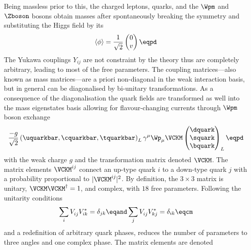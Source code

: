Being massless prior to this, the charged leptons, quarks, and the $\Wpm$ and
$\Zboson$ bosons obtain masses after spontaneously breaking the symmetry and
substituting the Higgs field by its \VEV
%
\begin{equation}\label{sec:cpv_theory:flavour_physics:ckm_matrix:higgs_vev}
  \langle\phi\rangle = \frac{1}{\sqrt{2}} \begin{pmatrix}
    0 \\
    v \\
  \end{pmatrix}\eqpd
\end{equation}
%
The Yukawa couplings $Y_{ij}$ are not constraint by the theory thus are
completely arbitrary, leading to most of the free \SM parameters. The coupling
matrices---also known as mass matrices---are a priori non-diagonal in the weak
interaction basis, but in general can be diagonalised by bi-unitary
transformations. As a consequence of the diagonalisation the quark fields are
transformed as well into the mass eigenstates basis allowing for
flavour-changing currents through $\Wpm$ boson exchange 
%
\begin{equation}
  \frac{-g}{\sqrt{2}} \left( \uquarkbar, \cquarkbar, \tquarkbar \right)_L \gamma^\mu \Wp_\mu \VCKM 
  \begin{pmatrix}
    \dquark \\
    \squark \\
    \bquark \\
  \end{pmatrix}_L \eqpd
\end{equation}
%
with the weak charge $g$ and the transformation matrix denoted $\VCKM$. The \CKM
matrix elements $\VCKM^{ij}$ connect an up-type quark $i$ to a down-type quark
$j$ with a probability proportional to $\vert\VCKM^{ij}\vert^2$. By definition, the
$3 \times 3$ \CKM matrix is unitary, $\VCKM\VCKM^\dagger=1$, and complex, with
$\num{18}$ free parameters. Following the unitarity conditions
%
\begin{equation}\label{sec:cpv_theory:flavour_physics:ckm_matrix:unitarity_relations}
  \sum_i V_{ij}^{\phantom{\ast}} V_{ik}^{\ast} = \delta_{jk} \eqand
  \sum_j V_{ij}^{\phantom{\ast}} V_{kj}^{\ast} = \delta_{ik} \eqcm
\end{equation}
%
and a redefinition of arbitrary quark phases, reduces the number of parameters
to three angles and one complex phase. The matrix elements are denoted
%
